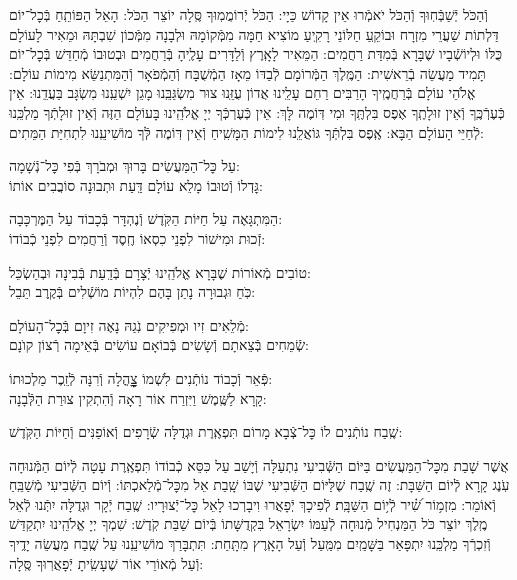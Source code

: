 \documentclass[twoside, openany, parskip=half, 11pt]{book}
\begin{document}
 וְֿהַכֹּל יְֿשַׁבְּֿחֽוּךָ וְֿהַכֹּל יֹאמְֿרוּ אֵין קָדוֹשׁ כַּיָי: הַכֹּל יְֿרוֹמֲמֽוּךָ סֶּֽלָה יוֹצֵר הַכֹּל: הָאֵל הַפּוֹתֵֽחַ בְּֿכׇל־יוֹם דַּלְתוֹת שַׁעֲרֵי מִזְרָח
  וּבוֹקֵֽעַ חַלּוֹנֵי רָקִֽיעַ מוֹצִיא חַמָּה מִמְּֿקוֹמָהּ וּלְבָנָה מִמְּֿכוֹן שִׁבְתָּהּ
  וּמֵאִיר לָעוֹלָם כֻּלּוֹ וּלְיוֹשְֿׁבָיו שֶׁבָּרָא בְּֿמִדַּת רַחֲמִים: הַמֵּאִיר לָאָֽרֶץ וְֿלַדָּרִים עָלֶֽיהָ בְּֿרַחֲמִים וּבְטוּבוֹ מְֿחַדֵּשׁ בְּֿכׇל־יוֹם תָּמִיד מַעֲשֵׂה בְֿרֵאשִׁית:
  הַמֶּֽלֶךְ הַמְּֿרוֹמָם לְֿבַדּוֹ מֵאָז הַמְֿשֻׁבָּח וְֿהַמְֿפֹאָר וְֿהַמִּתְנַשֵּׂא מִימוֹת עוֹלָם: אֱלֹהֵי עוֹלָם בְּֿרַחֲמֶֽיךָ הָרַבִּים רַחֵם עָלֵֽינוּ אֲדוֹן עֻזֵּֽנוּ צוּר מִשְׂגַּבֵּֽנוּ מָגֵן יִשְׁעֵֽנוּ מִשְׂגָּב בַּעֲדֵֽנוּ:
  אֵין כְּֿעֶרְֿכֶּֽךָ וְֿאֵין זוּלָתֶֽךָ אֶפֶס בִּלְתֶּֽךָ וּמִי דּֽוֹמֶה לָּךְ:
  אֵין כְּֿעֶרְכְּֿךָ יְיָ אֱלֹהֵֽינוּ בָּעוֹלָם הַזֶּה וְֿאֵין זוּלָתְֿךָ מַלְכֵּֽנוּ לְֿחַיֵּי הָעוֹלָם הַבָּא:
  אֶֽפֶס בִּלְתְּֿךָ גּוֹאֲלֵֽנוּ לִימוֹת הַמָּשִֽׁיחַ וְֿאֵין דּֽוֹמֶה לְּֿךָ מוֹשִׁיעֵֽנוּ לִתְחִיַּת הַמֵּתִים:

עַל כׇּל־הַמַּעֲשִׂים \hfill בָּרוּךְ וּמְבֹרָךְ בְּֿפִי כׇּל־נְֿשָׁמָה: \\
גׇּדְלוֹ וְֿטוּבוֹ מָלֵא עוֹלָם \hfill דַּֽעַת וּתְבוּנָה סוֹבֲבִים אוֹתוֹ:

הַמִּתְגָּאֶה עַל חַיּוֹת הַקֹּֽדֶשׁ \hfill וְֿנֶהְדָּר בְּֿכָבוֹד עַל הַמֶּרְכָּבָה:\\
זְֿכוּת וּמִישׁוֹר לִפְנֵי כִסְאוֹ \hfill חֶֽסֶד וְֿרַחֲמִים לִפְנֵי כְֿבוֹדוֹ:

טוֹבִים מְֿאוֹרוֹת שֶׁבָּרָא אֱלֹהֵֽינוּ \hfill יְֿצָרָם בְּֿדַֽעַת בְּֿבִינָה וּבְהַשְׂכֵּל:\\
כֹּֽחַ וּגְבוּרָה נָתַן בָּהֶם \hfill לִהְיוֹת מוֹשְֿׁלִים בְּֿקֶֽרֶב תֵּבֵל:

מְֿלֵאִים זִיו וּמְפִיקִים נֹֽגַהּ \hfill נָאֶה זִיוָם בְּֿכׇל־הָעוֹלָם: \\
שְֿׂמֵחִים בְּֿצֵאתָם וְֿשָׂשִׂים בְּֿבוֹאָם \hfill עוֹשִׂים בְּֿאֵימָה רְֿצוֹן קוׂנָם:

פְּֿאֵר וְֿכָבוֹד נוֹתְֿנִים לִשְׁמוֹ \hfill צׇׇׇׇׇׇׇׇָהֳלָה וְֿרִנָּה לְֿזֵֽכֶר מַלְכוּתוֹ: \\
קָרָא לַשֶּֽׁמֶשׁ וַיִּזְרַח אוֹר \hfill רָאָה וְֿהִתְקִין צוּרַת הַלְּֿבָנָה:

שֶֽׁבַח נוֹתְֿנִים לוֹ כׇּל־צְֿבָא מָרוֹם \hfill תִּפְאֶֽרֶת וּגְדֻלָּה שְֿׂרָפִים וְֿאוֹפַנִּים וְֿחַיּוֹת הַקֹּֽדֶשׁ:

 אֲשֶׁר שָׁבַת מִכׇּל־הַמַּעֲשִׂים בַּיּוֹם הַשְּֿׁבִיעִי נִתְעַלָּה וְֿיָשַׁב עַל כִּסֵּא כְֿבוֹדוֹ תִּפְאֶֽרֶת עָטָה לְֿיוֹם הַמְּֿנוּחָה עֹֽנֶג קָרָא לְֿיוֹם הַשַּׁבָּת: זֶה שֶֽׁבַח שֶׁלַּיּוֹם הַשְּֿׁבִיעִי שֶׁבּוֹ שָֽׁבַת אֵל מִכׇּל־מְֿלַאכְתּוֹ: וְֿיוֹם הַשְּֿׁבִיעִי מְֿשַׁבֵּֽחַ וְֿאוֹמֵר:
%
 מִזְמ֥וֹר שִׁ֝֗יר לְֿי֥וֹם הַשַּׁבָּֽת׃ לְֿפִיכָךְ יְֿפָאֲרוּ וִיבָרְכוּ לָאֵל כׇּל־יְֿצוּרָיו: שֶֽׁבַח יְֿקָר וּגְדֻלָּה יִתְּֿנוּ לְֿאֵל מֶֽלֶךְ יוֹצֵר כֹּל הַמַּנְחִיל מְֿנוּחָה לְֿעַמּוֹ יִשְׂרָאֵל בִּקְדֻשָּׁתוֹ בְּֿיוֹם שַׁבַּת קֹֽדֶשׁ: שִׁמְךָ יְיָ אֱלֹהֵֽינוּ יִתְקַדַּשׁ וְֿזִכְרְֿךָ מַלְכֵּֽנוּ יִתְפָּאַר בַּשָּׁמַֽיִם מִמַּֽעַל וְֿעַל הָאָֽרֶץ מִתָּֽחַת: תִּתְבָּרַךְ מוֹשִׁיעֵֽנוּ עַל שֶֽׁבַח מַעֲשֵׂה יָדֶֽיךָ וְֿעַל מְֿאוֹרֵי אוֹר שֶׁעָשִֽׂיתָ יְֿפָאֲרֽוּךָ סֶּֽלָה:
\end{document}
